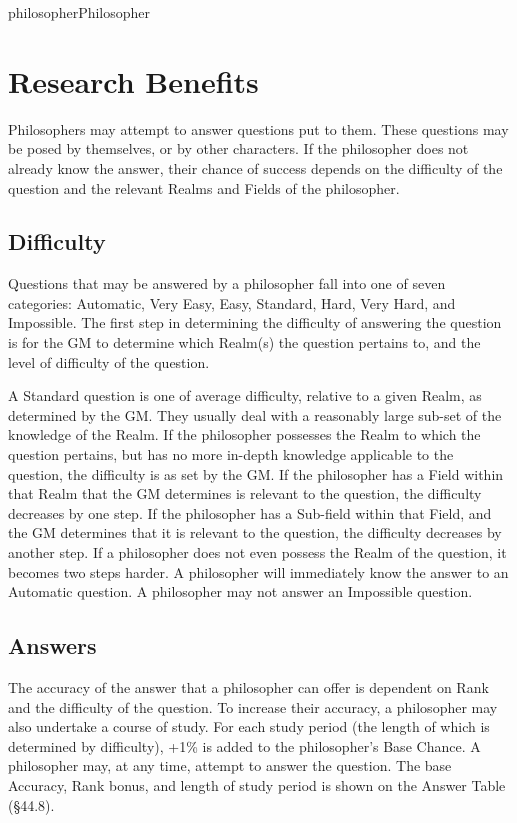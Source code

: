 \begin{Skill}[2.0]{philosopher}{Philosopher}
\section{Research Benefits}

Philosophers may attempt to answer questions put to them.  These
questions may be posed by themselves, or by other characters.  If the
philosopher does not already know the answer, their chance of success
depends on the difficulty of the question and the relevant Realms and
Fields of the philosopher.

\subsection{Difficulty}

Questions that may be answered by a philosopher fall into one of seven
categories: Automatic, Very Easy, Easy, Standard, Hard, Very Hard, and
Impossible.  The first step in determining the difficulty of answering
the question is for the GM to determine which Realm(s) the question
pertains to, and the level of difficulty of the question.

A Standard question is one of average difficulty, relative to a given
Realm, as determined by the GM.  They usually deal with a reasonably
large sub-set of the knowledge of the Realm.  If the philosopher
possesses the Realm to which the question pertains, but has no more
in-depth knowledge applicable to the question, the difficulty is as
set by the GM.  If the philosopher has a Field within that Realm that
the GM determines is relevant to the question, the difficulty
decreases by one step.  If the philosopher has a Sub-field within that
Field, and the GM determines that it is relevant to the question, the
difficulty decreases by another step.  If a philosopher does not even
possess the Realm of the question, it becomes two steps harder.  A
philosopher will immediately know the answer to an Automatic
question. A philosopher may not answer an Impossible question.

\subsection{Answers}

The accuracy of the answer that a philosopher can offer is dependent
on Rank and the difficulty of the question. To increase their
accuracy, a philosopher may also undertake a course of study.  For
each study period (the length of which is determined by difficulty),
+1\% is added to the philosopher’s Base Chance. A philosopher may, at
any time, attempt to answer the question.  The base Accuracy, Rank
bonus, and length of study period is shown on the Answer Table
(§44.8).


\end{Skill}
